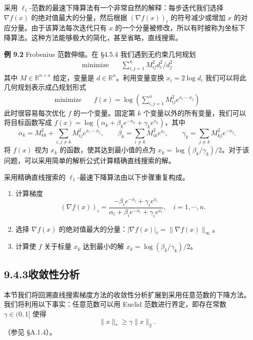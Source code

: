 \documentclass[UTF8,12pt,a4paper,fontset=fandol]{ctexart}
\begin{document}
采用 $\ell_1$-范数的最速下降算法有一个非常自然的解释：每步迭代我们选择 $\nabla f(x)$ 的绝对值最大的分量，然后根据 $(\nabla f(x))_i$ 的符号减少或增加 $x$ 的对应分量。由于该算法每次迭代只有 $x$ 的一个分量被修改，所以有时被称为坐标下降算法。这种方法能够极大的简化，甚至省略，直线搜索。

\noindent\textbf{例 9.2}\quad
Frobenius 范数伸缩。在 \S4.5.4 我们遇到无约束几何规划
\[
\begin{aligned}
\text{minimize}\quad & \sum_{i,j=1}^n M_{ij}^2d_i^2/d_j^2
\end{aligned}
\]
其中 $M\in\mathbb{R}^{n\times n}$ 给定，变量是 $d\in\mathbb{R}^n$。利用变量变换 $x_i=2\log d_i$ 我们可以将此几何规划表示成凸规划形式
\[
\begin{aligned}
\text{minimize}\quad & f(x)=\log\left(\sum_{i,j=1}^n M_{ij}^2e^{x_i-x_j}\right)
\end{aligned}
\]
此时很容易每次优化 $f$ 的一个变量。固定第 $k$ 个变量以外的所有变量，我们可以将目标函数写成 $f(x)=\log(\alpha_k+\beta_ke^{-x_k}+\gamma_ke^{x_k})$，其中
\[
\alpha_k=M_{kk}^2+\sum_{i,j\neq k}M_{ij}^2e^{x_i-x_j},\qquad
\beta_k=\sum_{i\neq k}M_{ik}^2e^{x_i},\qquad
\gamma_k=\sum_{j\neq k}M_{kj}^2e^{-x_j}.
\]
将 $f(x)$ 视为 $x_k$ 的函数，使其达到最小值的点为 $x_k=\log(\beta_k/\gamma_k)/2$。对于该问题，可以采用简单的解析公式计算精确直线搜索的解。

采用精确直线搜索的 $\ell_1$-最速下降算法由以下步骤重复构成。
\begin{enumerate}
\item 计算梯度
\[
(\nabla f(x))_i=\frac{-\beta_ie^{-x_i}+\gamma_ie^{x_i}}{\alpha_i+\beta_ie^{-x_i}+\gamma_ie^{x_i}},\quad i=1,\cdots,n.
\]
\item 选择 $\nabla f(x)$ 的绝对值最大的分量：$|\nabla f(x)|_\ell=\|\nabla f(x)\|_\infty$。
\item 计算使 $f$ 关于标量 $x_k$ 达到最小的解 $x_k=\log(\beta_k/\gamma_k)/2$。
\end{enumerate}

\subsection*{9.4.3\quad 收敛性分析}

本节我们将回溯直线搜索梯度方法的收敛性分析扩展到采用任意范数的下降方法。我们将利用以下事实：任意范数可以用 Euclid 范数进行界定，即存在常数 $\gamma\in(0,1]$ 使得
\[
\|x\|_\ast\geq\gamma\|x\|_2.
\]
（参见 \S A.1.4）。
\end{document}
